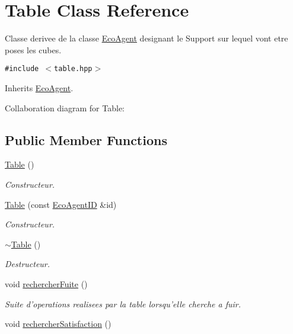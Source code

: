\hypertarget{classTable}{
\section{Table Class Reference}
\label{classTable}
}
Classe derivee de la classe \hyperlink{classEcoAgent}{EcoAgent} designant le Support sur lequel vont etre poses les cubes.  


{\tt \#include $<$table.hpp$>$}

Inherits \hyperlink{classEcoAgent}{EcoAgent}.

Collaboration diagram for Table:\subsection*{Public Member Functions}
\begin{CompactItemize}
\item 
\hyperlink{classTable_049f2e06391781ae255c6698869c4ad1}{Table} ()
\begin{CompactList}\small\item\em Constructeur. \item\end{CompactList}\item 
\hyperlink{classTable_6fbbe063e4ee08c066a1095a7320acf4}{Table} (const \hyperlink{classEcoAgentID}{EcoAgentID} \&id)
\begin{CompactList}\small\item\em Constructeur. \item\end{CompactList}\item 
\hyperlink{classTable_9a559f2e7beb37b511ee9f88873164f8}{$\sim$Table} ()
\begin{CompactList}\small\item\em Destructeur. \item\end{CompactList}\item 
\hypertarget{classTable_e5da6b33fc4bfa706559b50668b3e5b4}{
void \hyperlink{classTable_e5da6b33fc4bfa706559b50668b3e5b4}{rechercherFuite} ()}
\label{classTable_e5da6b33fc4bfa706559b50668b3e5b4}

\begin{CompactList}\small\item\em Suite d'operations realisees par la table lorsqu'elle cherche a fuir. \item\end{CompactList}\item 
\hypertarget{classTable_3fc58e0af8f075440c9184f674e1d02e}{
void \hyperlink{classTable_3fc58e0af8f075440c9184f674e1d02e}{rechercherSatisfaction} ()}
\label{classTable_3fc58e0af8f075440c9184f674e1d02e}


\end{CompactItemize}
